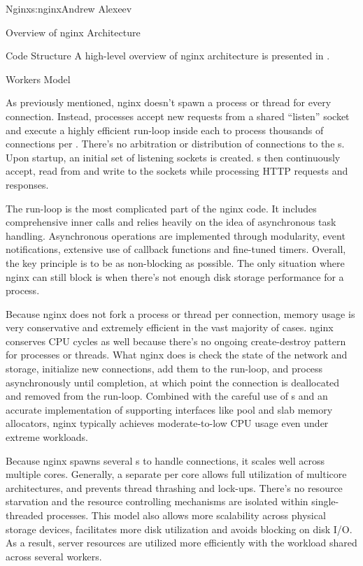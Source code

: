 \begin{aosachapter}{Nginx}{s:nginx}{Andrew Alexeev}
\begin{aosasect1}{Overview of nginx Architecture}
\begin{aosasect2}{Code Structure}
A high-level overview of nginx architecture is presented in
.


\end{aosasect2}

\begin{aosasect2}{Workers Model}

As previously mentioned, nginx doesn't spawn a process or thread for
every connection. Instead,  processes accept new requests
from a shared ``listen'' socket and execute a highly efficient
run-loop inside each  to process thousands of connections
per . There's no arbitration or distribution of
connections to the s. Upon startup, an initial set of
listening sockets is created. s then continuously accept,
read from and write to the sockets while processing HTTP requests and
responses.

The run-loop is the most complicated part of the nginx 
code. It includes comprehensive inner calls and relies heavily on the
idea of asynchronous task handling. Asynchronous operations are
implemented through modularity, event notifications, extensive use of
callback functions and fine-tuned timers. Overall, the key principle
is to be as non-blocking as possible. The only situation where nginx
can still block is when there's not enough disk storage performance
for a  process.

Because nginx does not fork a process or thread per connection, memory
usage is very conservative and extremely efficient in the vast
majority of cases. nginx conserves CPU cycles as well because there's
no ongoing create-destroy pattern for processes or threads. What nginx
does is check the state of the network and storage, initialize new
connections, add them to the run-loop, and process asynchronously
until completion, at which point the connection is deallocated and
removed from the run-loop. Combined with the careful use of
s and an accurate implementation of supporting
interfaces like pool and slab memory allocators, nginx typically
achieves moderate-to-low CPU usage even under extreme workloads.

Because nginx spawns several s to handle connections, it
scales well across multiple cores. Generally, a separate 
per core allows full utilization of multicore architectures, and
prevents thread thrashing and lock-ups. There's no resource starvation
and the resource controlling mechanisms are isolated within
single-threaded  processes. This model also allows more
scalability across physical storage devices, facilitates more disk
utilization and avoids blocking on disk I/O. As a result, server
resources are utilized more efficiently with the workload shared
across several workers.


\end{aosasect2}
\end{aosasect1}
\end{aosachapter}
